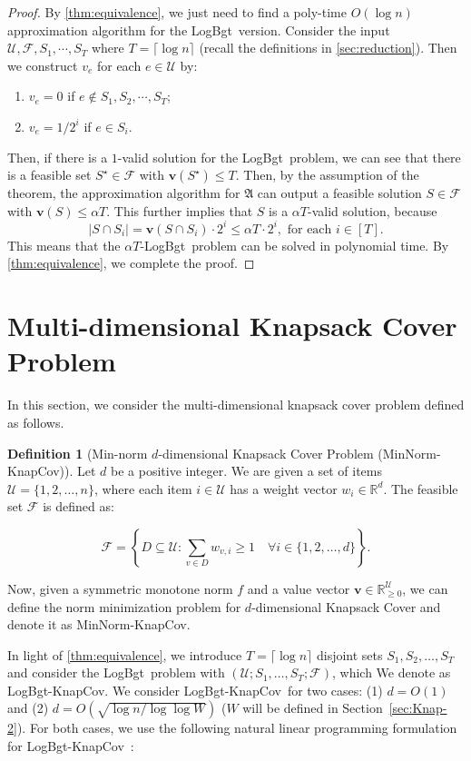 \documentclass[11pt,a4paper]{article} \usepackage{enumitem}
\newcommand{\calF}{\mathcal{F}}
\newcommand{\calU}{\mathcal{U}}
\newcommand{\boldv}{\boldsymbol{v}}
\newcommand{\LBO}{\textsf{LogBgt}}
\newcommand{\minnormknapcov}{\textsf{MinNorm-KnapCov}}
\newcommand{\LBOknapcov}{\textsf{LogBgt-KnapCov}}
\newcommand{\myproblem}{\mathfrak{A}}
\theoremstyle{definition}
\newtheorem{definition}{Definition}[section]
\begin{document}
\begin{proof}
By \cref{thm:equivalence}, we just need to find a poly-time $O(\log n)$ approximation algorithm for the \LBO\ version.
Consider the input $\calU,\calF,S_1,\cdots,S_T$ where $T=\lceil \log n\rceil$ (recall the definitions in \cref{sec:reduction}).
Then we construct $v_e$ for each $e\in \calU$ by:
\begin{enumerate}
\item $v_e=0$ if $e\not\in S_1,S_2,\cdots,S_T$;
\item $v_e=1/2^i$ if $e\in S_i$.
\end{enumerate}
Then, if there is a $1$-valid solution for the \LBO\ problem, 
we can see that 
there is a feasible set $S^\star\in\calF$ with $\boldv(S^\star)\leq T$.
Then, by the assumption of the theorem, the approximation algorithm for $\myproblem$ can output a feasible solution $S\in \calF$ with $\boldv(S)\leq \alpha T$.
This further implies that
$S$ is a $\alpha T$-valid solution, because
$$
|S\cap S_i|=\boldv(S\cap S_i)\cdot 2^i\leq \alpha T \cdot 2^i,
\text{ for each } i\in [T].
$$
This means that the $\alpha T$-\LBO\ problem can be solved in polynomial time.
By \cref{thm:equivalence}, we complete the proof.
\end{proof}
 
\section{Multi-dimensional Knapsack Cover Problem} 
\label{sec:knapsackcover}
In this section, we consider the multi-dimensional knapsack cover problem
defined as follows.

\begin{definition}[Min-norm $d$-dimensional Knapsack Cover Problem (\minnormknapcov)]
Let $d$ be a positive integer.
We are given a set of items $\calU = \{1, 2, \dots, n\}$, where each item $i \in \calU$ has a weight vector $w_i \in \mathbb{R}^d$. The feasible set $\calF$ is defined as:

\[
\calF = \left\{ D \subseteq \calU : \sum_{v \in D} w_{v,i} \geq 1 \quad \forall i \in \{1, 2, \dots, d\} \right\}.
\]

Now, given a symmetric monotone norm $f$ and a value vector $\boldv \in \mathbb{R}_{\geq 0}^{\calU}$,
we can define the norm minimization problem for $d$-dimensional Knapsack Cover and denote it as \minnormknapcov.
\end{definition}

In light of \cref{thm:equivalence}, 
we introduce $T = \lceil \log n \rceil$ disjoint sets $S_1, S_2, \dots, S_T$ and consider the \LBO\ problem with $(\calU;S_1,\ldots,S_{T};\calF)$,
which We denote as 
\LBOknapcov.
We consider \LBOknapcov\ for two cases:
(1)
$d=O(1)$ and 
(2) \(d = O( \sqrt{\log n/\log\log W})\) ($W$ will be defined 
in Section~\ref{sec:Knap-2}).
For both cases, we use the following natural linear programming formulation for \LBOknapcov\ :
\end{document}
